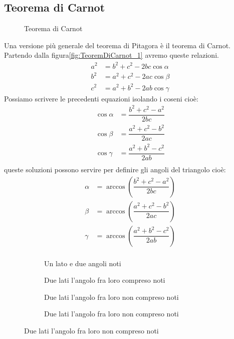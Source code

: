 \subsection{Teorema di Carnot}
\begin{figure}
	\centering
	
	\caption{Teorema di Carnot}
	\label{fig:TeoremDiCarnot_1}
\end{figure}
Una versione più generale del teorema di Pitagora è il teorema di Carnot. Partendo dalla figura\nobs\vref{fig:TeoremDiCarnot_1} avremo queste relazioni.
\begin{align*}
a^2&=b^2+c^2-2bc\cos\alpha\\
b^2&=a^2+c^2-2ac\cos\beta\\
c^2&=a^2+b^2-2ab\cos\gamma
\end{align*}
Possiamo scrivere le precedenti equazioni isolando i coseni cioè:
\begin{align*}
\cos\alpha&=\dfrac{b^2+c^2-a^2}{2bc}\\
\cos\beta&=\dfrac{a^2+c^2-b^2}{2ac}\\
\cos\gamma&=\dfrac{a^2+b^2-c^2}{2ab}\\
\end{align*}
queste soluzioni possono servire per definire gli angoli del triangolo cioè:
\begin{align*}
\alpha&=\arccos(\dfrac{b^2+c^2-a^2}{2bc})\\
\beta&=\arccos(\dfrac{a^2+c^2-b^2}{2ac})\\
\gamma&=\arccos(\dfrac{a^2+b^2-c^2}{2ab})\\
\end{align*}
\begin{figure}
	\begin{subfigure}[b]{.5\linewidth}
		\centering

	\caption{Un lato e due angoli noti}
	\label{fig:risTriangQqualunque_1}
	\end{subfigure}%
	\begin{subfigure}[b]{.5\linewidth}
		\centering
	
		\caption{Due lati l'angolo fra loro compreso noti}
		\label{fig:risTriangQqualunque_2}
	\end{subfigure}
	\begin{subfigure}[b]{.5\linewidth}
		\centering
		
		\caption{Due lati l'angolo fra loro non compreso noti}
		\label{fig:risTriangQqualunque_3}
	\end{subfigure}%
	\begin{subfigure}[b]{.5\linewidth}
		\centering
		
		\caption{Due lati l'angolo fra loro non compreso noti}
		\label{fig:risTriangQqualunque_4}
	\end{subfigure}
	\label{fig:RisoluzioneTriangoliQualunque}
\end{figure}
